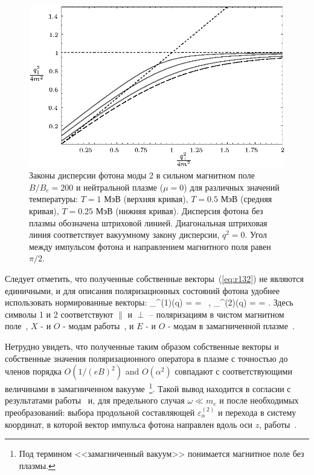 \begin{figure}[t!]
	\centerline{\includegraphics[width = 15cm]{fig2_1.eps}}
	\vspace*{-2mm} \caption{Законы дисперсии фотона моды 2 в сильном магнитном поле  $B/B_e = 200$  
		и нейтральной плазме ($\mu=0$) для различных значений температуры:  $T = 1$ МэВ 
		(верхняя кривая), $T = 0.5$ МэВ (средняя кривая), $T = 0.25$ МэВ (нижняя кривая). 
		Дисперсия фотона без плазмы обозначена штриховой линией.
		Диагональная штриховая линия соответствует вакуумному закону дисперсии, $q^2 = 0$. Угол
		между импульсом фотона  и направлением  магнитного поля равен 
		$\pi/2$. } 
	\label{fig:disT}
\end{figure}

Следует отметить, что полученные собственные векторы~(\ref{eq:r132}) не являются единичными, и для описания поляризационных состояний фотона удобнее использовать нормированные векторы:
%
\beq
\label{eq:epsilon}
\varepsilon_\alpha^{(1)}(q) =  = 
 \, , \quad
\varepsilon_\alpha^{(2)}(q) =  = 
.
\eeq
\noindent Здесь символы 1 и 2 соответствуют  $\|$ и $\perp$ --  поляризациям в чистом магнитном поле~\cite{Adler:1971}, $X$ - и $O$ -  модам работы~\cite{Mushtukov:2016}, и $E$ - и $O$ -  модам в замагниченной плазме~\cite{Thompson:1996}. 

Нетрудно увидеть, что полученные таким образом собственные векторы и собственные значения поляризационного 
оператора в плазме с точностью до членов порядка  $O(1/(eB)^2)$ and $O(\alpha^2)$ совпадают с соответствующими величинами в  замагниченном вакууме~\footnote{Под термином <<замагниченный вакуум>>  понимается магнитное поле без плазмы.}. Такой вывод находится в согласии с результатами работы~\cite{Shabad:1988} и, для предельного случая $\omega \ll m_e$ и после необходимых преобразований: выбора продольной составляющей $\varepsilon^{(2)}_\alpha$ и перехода в систему координат, в которой вектор импульса фотона направлен вдоль оси $z$, работы~\cite{Potekhin:2004}.

